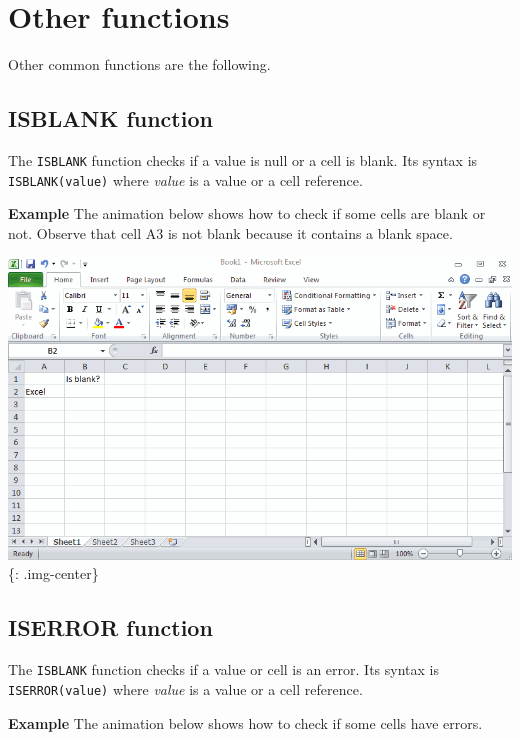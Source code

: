 \chapter{Other functions}
\label{otherfunctions}

Other common functions are the following. 

\section{ISBLANK function}
\label{isblankfunction}

The \texttt{ISBLANK} function checks if a value is null or a cell is blank. Its syntax is \texttt{ISBLANK(value)} where \emph{value} is a value or a cell reference. 

\textbf{Example} The animation below shows how to check if some cells are blank or not. Observe that cell A3 is not blank because it contains a blank space.

\includegraphics[keepaspectratio,width=\textwidth,height=0.75\textheight]{img/example_function_isblank.gif}
\{: .img-center\}

\section{ISERROR function}
\label{iserrorfunction}

The \texttt{ISBLANK} function checks if a value or cell is an error. Its syntax is \texttt{ISERROR(value)} where \emph{value} is a value or a cell reference. 

\textbf{Example} The animation below shows how to check if some cells have errors.

